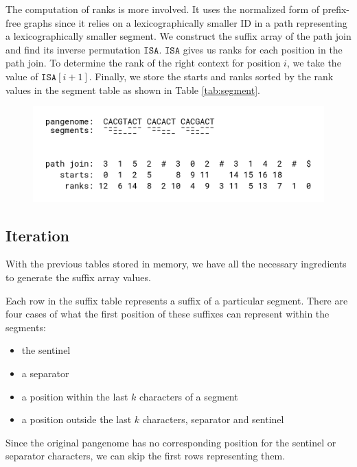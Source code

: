 The computation of ranks is more involved.
It uses the normalized form of prefix-free graphs since it relies on a lexicographically smaller ID in a path representing a lexicographically smaller segment.
We construct the suffix array of the path join and find its inverse permutation $\texttt{ISA}$.
$\texttt{ISA}$ gives us ranks for each position in the path join.
To determine the rank of the right context for position $i$, we take
the value of $\texttt{ISA}[i+1]$.
Finally, we store the starts and ranks sorted by the rank values in the segment table as shown in Table \ref{tab:segment}.

\begin{figure}
    \centering
    \includegraphics[width=\linewidth]{images/path_join.png}
    \caption{}
    \label{fig:path_join}
\end{figure}



\subsection{Iteration}
With the previous tables stored in memory, we have all the necessary ingredients to generate the suffix array values.

Each row in the suffix table represents a suffix of a particular segment.
There are four cases of what the first position of these suffixes can represent within the segments:
\begin{itemize}
    \item the sentinel
    \item a separator
    \item a position within the last $k$ characters of a segment
    \item a position outside the last $k$ characters, separator and sentinel
\end{itemize}

Since the original pangenome has no corresponding position for the sentinel or separator characters, we can skip the first rows representing them.

